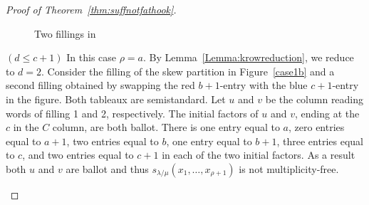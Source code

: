 \begin{proof}[Proof of Theorem~\ref{thm:suffnotfathook}]
\begin{Case}
\begin{figure}[htb]
\begin{subfigure}{0.45\textwidth}
 \caption{}
 \label{case1a(ii)}
 \end{subfigure}

\vspace*{-3mm}
 \caption[Two fillings in Case 1.1]{Two fillings in }
 \label{case1a} 
\end{figure}

\end{Case}

\begin{Case}
{ $(d\leq c+1)$} 
In this case $\rho = a$. By Lemma~\ref{Lemma:krowreduction}, we reduce to $d=2$. Consider the filling of the skew partition in Figure~\ref{case1b} and a second filling obtained by swapping the red $b+1$-entry with the blue $c+1$-entry in the figure. Both tableaux are semistandard. Let $u$ and $v$ be the column reading words of filling 1 and 2, respectively. The initial factors of $u$ and $v$, ending at the $c$ in the $C$ column, are both ballot. There is one entry equal to $a$, zero entries equal to $a+1$, two entries equal to $b$, one entry equal to $b+1$, three entries equal to $c$, and two entries equal to $c+1$ in each of the two initial factors. As a result both $u$ and $v$ are ballot and thus $s_{\lambda/\mu}(x_1,\ldots,x_{\rho+1})$ is not multiplicity-free.

\begin{figure}[htb]\centering
\end{figure}
\end{Case}
\end{proof}
